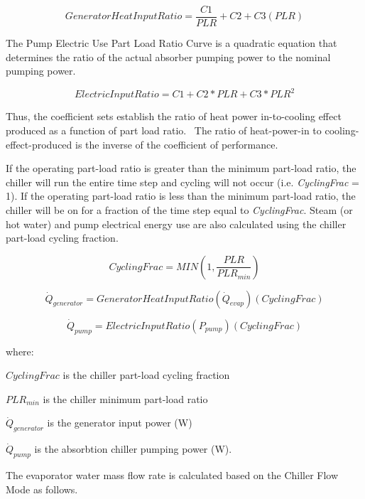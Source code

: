 \begin{equation}
GeneratorHeatInputRatio = \frac{{C1}}{{PLR}} + C2 + C3\left( {PLR} \right)
\end{equation}

The Pump Electric Use Part Load Ratio Curve is a quadratic equation that determines the ratio of the actual absorber pumping power to the nominal pumping power.

\begin{equation}
ElectricInputRatio = C1 + C2 * PLR + C3 * PL{R^2}
\end{equation}

Thus, the coefficient sets establish the ratio of heat power in-to-cooling effect produced as a function of part load ratio.~ The ratio of heat-power-in to cooling-effect-produced is the inverse of the coefficient of performance.

If the operating part-load ratio is greater than the minimum part-load ratio, the chiller will run the entire time step and cycling will not occur (i.e. \emph{CyclingFrac} = 1). If the operating part-load ratio is less than the minimum part-load ratio, the chiller will be on for a fraction of the time step equal to \emph{CyclingFrac}. Steam (or hot water) and pump electrical energy use are also calculated using the chiller part-load cycling fraction.

\begin{equation}
CyclingFrac = MIN\left( {1,\frac{{PLR}}{{PL{R_{min}}}}} \right)
\end{equation}

\begin{equation}
{\dot Q_{generator}} = GeneratorHeatInputRatio\left( {{{\dot Q}_{evap}}} \right)\left( {CyclingFrac} \right)
\end{equation}

\begin{equation}
{\dot Q_{pump}} = ElectricInputRatio\left( {{P_{pump}}} \right)\left( {CyclingFrac} \right)
\end{equation}

where:

\(CyclingFrac\) is the chiller part-load cycling fraction

\(PL{R_{min}}\) is the chiller minimum part-load ratio

\({\dot Q_{generator}}\) is the generator input power (W)

\({\dot Q_{pump}}\) is the absorbtion chiller pumping power (W).

The evaporator water mass flow rate is calculated based on the Chiller Flow Mode as follows.

